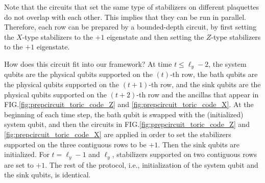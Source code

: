 \documentclass[prx,aps,amsmath,amssymb,floatfix,superscriptaddress,11pt,tightenlines,longbibliography,onecolumn,notitlepage]{revtex4-1}
\begin{document}
Note that the circuits that set the same type of stabilizers on different plaquettes do not overlap with each other. This implies that they can be run in parallel. Therefore, each row can be prepared by a bounded-depth circuit, by first setting the $X$-type stabilizers to the $+1$ eigenstate and then setting the $Z$-type stabilizers to the $+1$ eigenstate.
\begin{comment}
\begin{figure}[h]
  \subfigure[$t=1$]{
    \begin{tikzpicture}[scale=0.9]
      \def\n{1}
      \node[] at (\n-1,-0.8) {$S_1$};
      \node[] at (\n,-0.8) {$B$};
      \foreach \x in {0,...,4}
      \foreach \y in {0,...,4}
      {
        \node[circle,draw=black,fill=black,scale=0.5](\x) at (\x,\y) {};
      }

      \foreach \x in {0,...,\n}
      {
        \draw (\x,0)--(\x,4);
      }

      \foreach \y in {0,...,4}
      {
        \draw (0,\y)--(\n,\y);
      }

      \foreach \x in {0}
      \foreach \y in {0,2}
      {
        \node[] at (\x+0.5,\y+0.5) {X};
      }

      \foreach \x in {0}
      \foreach \y in {1,3}
      {
        \node[] at (\x+0.5,\y+0.5) {Z};
      }
      \draw[domain=0:180] plot ({\n-0.5 + 0.5* cos(\x)},{0.5 * sin(\x)+4});
      \node[below] at (\n-0.5, 4.5) {X};
      \foreach \yy in {1,3}
      {
        \draw[domain=90:270] plot ({0.5*cos(\x)},{\yy-0.5+0.5*sin(\x)});
        \node[right] at (-0.5,\yy-0.5){Z};
      }  
    \end{tikzpicture}
    }
  \caption{  \label{fig:row_encoding1}}
\end{figure}
\end{comment}

How does this circuit fit into our framework? At time $t\leq \ell_y-2$, the system qubits are the physical qubits supported on the $(t)$-th row, the bath qubits are the physical qubits supported on the $(t+1)$-th row, and the sink qubits are the physical qubits supported on the $(t+2)$-th row and the ancillas that appear in FIG.\ref{fig:prepcircuit_toric_code_Z} and \ref{fig:prepcircuit_toric_code_X}. At the beginning of each time step, the bath qubit is swapped with the (initialized) system qubit, and then the circuits in FIG.\ref{fig:prepcircuit_toric_code_Z} and \ref{fig:prepcircuit_toric_code_X} are applied in order to set the stabilizers supported on the three contiguous rows to be $+1$. Then the sink qubits are initialized. For $t=\ell_y-1$ and  $\ell_y$, stabilizers supported on two contiguous rows are set to $+1$. The rest of the protocol, i.e., initialization of the system qubit and the sink qubits, is identical.
\end{document}
